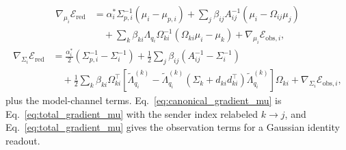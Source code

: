 \begin{equation}
\begin{aligned}
\nabla_{\mu_i}\mathcal{E}_{\mathrm{red}} &= \alpha_i^*\Sigma_{p,i}^{-1}(\mu_i - \mu_{p,i}) + \sum_j \beta_{ij}A_{ij}^{-1}(\mu_i - \Omega_{ij}\mu_j) \\
&\quad + \sum_k \beta_{ki}\Lambda_{q_i}\Omega_{ki}^{-1}\left(\Omega_{ki}\mu_i - \mu_k\right) + \nabla_{\mu_i}\mathcal{E}_{\mathrm{obs},i},
\end{aligned}
\label{eq:canonical_gradient_mu}
\end{equation}
\begin{equation}
\begin{aligned}
\nabla_{\Sigma_i}\mathcal{E}_{\mathrm{red}} &= \frac{\alpha_i^*}{2}\left(\Sigma_{p,i}^{-1} - \Sigma_i^{-1}\right) + \frac{1}{2}\sum_j \beta_{ij}\left(A_{ij}^{-1} - \Sigma_i^{-1}\right) \\
&\quad + \frac{1}{2}\sum_k \beta_{ki}\Omega_{ki}^{\top}\left[\tilde{\Lambda}_{q_i}^{(k)} - \tilde{\Lambda}_{q_i}^{(k)}\left(\Sigma_k + d_{ki}d_{ki}^{\top}\right)\tilde{\Lambda}_{q_i}^{(k)}\right]\Omega_{ki} + \nabla_{\Sigma_i}\mathcal{E}_{\mathrm{obs},i},
\end{aligned}
\label{eq:canonical_gradient_sigma}
\end{equation}
plus the model-channel terms. Eq.~\eqref{eq:canonical_gradient_mu} is Eq.~\eqref{eq:total_gradient_mu} with the sender index relabeled $k \to j$, and Eq.~\eqref{eq:total_gradient_mu} gives the observation terms for a Gaussian identity readout.

